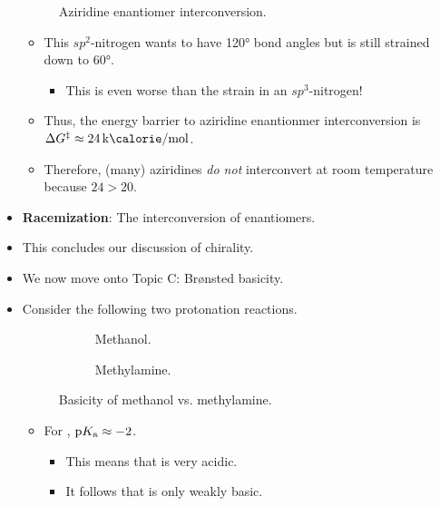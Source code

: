 \documentclass[../notes.tex]{subfiles}
\begin{document}
\begin{itemize}
\begin{figure}[h!]
{        }
        \caption{Aziridine enantiomer interconversion.}
        \label{fig:aziridineEnaIntercon}
    \end{figure}
    \begin{itemize}
        \item This $sp^2$-nitrogen wants to have \ang{120} bond angles but is still strained down to \ang{60}.
        \begin{itemize}
            \item This is even worse than the strain in an $sp^3$-nitrogen!
        \end{itemize}
        \item Thus, the energy barrier to aziridine enantionmer interconversion is $\Delta G^\ddagger\approx\kcal{24}$.
        \item Therefore, (many) aziridines \emph{do not} interconvert at room temperature because $24>20$.
    \end{itemize}
    \item \textbf{Racemization}: The interconversion of enantiomers.
    \item This concludes our discussion of chirality.
    \item We now move onto Topic C: Br\o nsted basicity.
    \item Consider the following two protonation reactions.
    \begin{figure}[h!]
        \centering
        \footnotesize
        \begin{subfigure}[b]{0.3\linewidth}
            \centering
            \caption{Methanol.}
            \label{fig:baseMeOHNH2a}
        \end{subfigure}
        \begin{subfigure}[b]{0.3\linewidth}
            \centering
            \caption{Methylamine.}
            \label{fig:baseMeOHNH2b}
        \end{subfigure}
        \caption{Basicity of methanol vs. methylamine.}
        \label{fig:baseMeOHNH2}
    \end{figure}
    \begin{itemize}
        \item For , $\textup{p}K_\textup{a}\approx -2$.
        \begin{itemize}
            \item This means that  is very acidic.
            \item It follows that  is only weakly basic.

\end{itemize}
\end{itemize}
\end{itemize}
\end{document}
